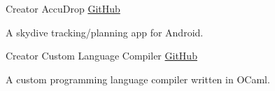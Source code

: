 






\begin{cventries}

  \cventry
    {Creator} %
    {AccuDrop} %
    {\href{https://github.com/ChrisLane/accudrop}{GitHub}} %
    {} %
    {
      \begin{cvitems} %
      \item {A skydive tracking/planning app for Android.}
      \end{cvitems}
    }

  \cventry
    {Creator} %
    {Custom Language Compiler} %
    {\href{https://github.com/ChrisLane/custom-lang-compiler}{GitHub}} %
    {} %
    {
      \begin{cvitems} %
      \item {A custom programming language compiler written in OCaml.}
      \end{cvitems}
    }


\end{cventries}
